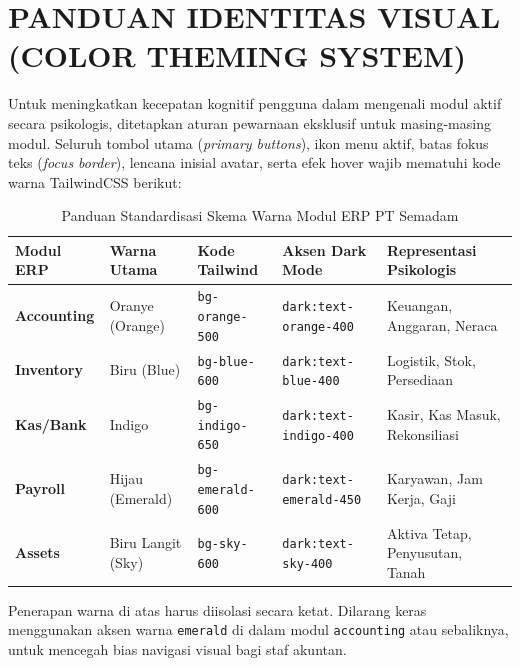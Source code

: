 \documentclass[11pt,a4paper]{article}
\begin{document}
\newpage

\section{PANDUAN IDENTITAS VISUAL (COLOR THEMING SYSTEM)}
Untuk meningkatkan kecepatan kognitif pengguna dalam mengenali modul aktif secara psikologis, ditetapkan aturan pewarnaan eksklusif untuk masing-masing modul. Seluruh tombol utama (\textit{primary buttons}), ikon menu aktif, batas fokus teks (\textit{focus border}), lencana inisial avatar, serta efek hover wajib mematuhi kode warna TailwindCSS berikut:

\begin{table}[h!]
\centering
\small
\begin{tabular}{lllll}
    \toprule
    \textbf{Modul ERP} & \textbf{Warna Utama} & \textbf{Kode Tailwind} & \textbf{Aksen Dark Mode} & \textbf{Representasi Psikologis} \\
    \midrule
    \textbf{Accounting} & Oranye (Orange) & \texttt{bg-orange-500} & \texttt{dark:text-orange-400} & Keuangan, Anggaran, Neraca \\
    \textbf{Inventory} & Biru (Blue) & \texttt{bg-blue-600} & \texttt{dark:text-blue-400} & Logistik, Stok, Persediaan \\
    \textbf{Kas/Bank} & Indigo & \texttt{bg-indigo-650} & \texttt{dark:text-indigo-400} & Kasir, Kas Masuk, Rekonsiliasi \\
    \textbf{Payroll} & Hijau (Emerald) & \texttt{bg-emerald-600} & \texttt{dark:text-emerald-450} & Karyawan, Jam Kerja, Gaji \\
    \textbf{Assets} & Biru Langit (Sky) & \texttt{bg-sky-600} & \texttt{dark:text-sky-400} & Aktiva Tetap, Penyusutan, Tanah \\
    \bottomrule
\end{tabular}
\caption{Panduan Standardisasi Skema Warna Modul ERP PT Semadam}
\end{table}

\begin{notealert}
Penerapan warna di atas harus diisolasi secara ketat. Dilarang keras menggunakan aksen warna \texttt{emerald} di dalam modul \texttt{accounting} atau sebaliknya, untuk mencegah bias navigasi visual bagi staf akuntan.
\end{notealert}

\newpage

\end{document}

